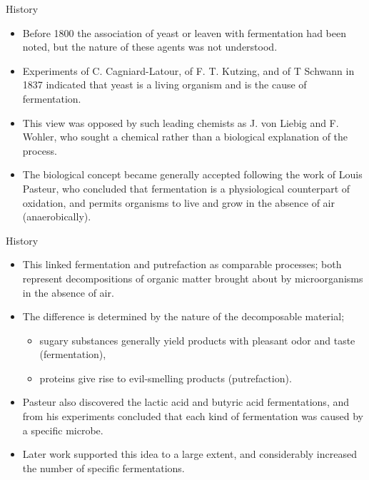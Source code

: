 \documentclass[ignorenonframetext,aspectratio=169]{beamer}
\providecommand{\tightlist}{%
  \setlength{\itemsep}{0pt}\setlength{\parskip}{0pt}}
\begin{document}
\begin{frame}{History}
\protect\hypertarget{history-4}{}

\begin{itemize}
\tightlist
\item
  Before 1800 the association of yeast or leaven with fermentation had
  been noted, but the nature of these agents was not understood.
\item
  Experiments of C. Cagniard-Latour, of F. T. Kutzing, and of T Schwann
  in 1837 indicated that yeast is a living organism and is the cause of
  fermentation.
\item
  This view was opposed by such leading chemists as J. von Liebig and F.
  Wohler, who sought a chemical rather than a biological explanation of
  the process.
\item
  The biological concept became generally accepted following the work of
  Louis Pasteur, who concluded that fermentation is a physiological
  counterpart of oxidation, and permits organisms to live and grow in
  the absence of air (anaerobically).
\end{itemize}

\end{frame}

\begin{frame}{History}
\protect\hypertarget{history-5}{}

\begin{itemize}
\tightlist
\item
  This linked fermentation and putrefaction as comparable processes;
  both represent decompositions of organic matter brought about by
  microorganisms in the absence of air.
\item
  The difference is determined by the nature of the decomposable
  material;

  \begin{itemize}
  \tightlist
  \item
    sugary substances generally yield products with pleasant odor and
    taste (fermentation),
  \item
    proteins give rise to evil-smelling products (putrefaction).
  \end{itemize}
\item
  Pasteur also discovered the lactic acid and butyric acid
  fermentations, and from his experiments concluded that each kind of
  fermentation was caused by a specific microbe.
\item
  Later work supported this idea to a large extent, and considerably
  increased the number of specific fermentations.
\end{itemize}

\end{frame}
\end{document}
